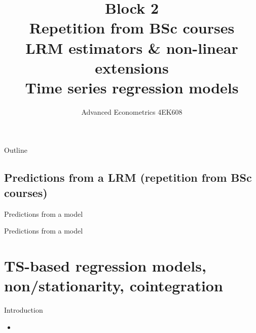 \documentclass{beamer}
\title[Block 2]{Block 2 \\  Repetition from BSc courses  \\ LRM estimators \& non-linear extensions\\ Time series regression models}
\author{Advanced Econometrics 4EK608}
\institute{Vysoká škola ekonomická v Praze}
\date{}
\begin{document}
 \begin{frame}
  \titlepage
\end{frame}
\begin{frame}{Outline}
  \tableofcontents
\end{frame}
\subsection{Predictions from a LRM (repetition from BSc courses)}
\begin{frame}{Predictions from a model}
    
\end{frame}



\begin{frame}{Predictions from a model}
    
\end{frame}







\section{TS-based regression models, non/stationarity, cointegration}

\begin{frame}{Introduction}

\begin{itemize}
  \item 
\end{itemize}

\end{frame}
\end{document}
